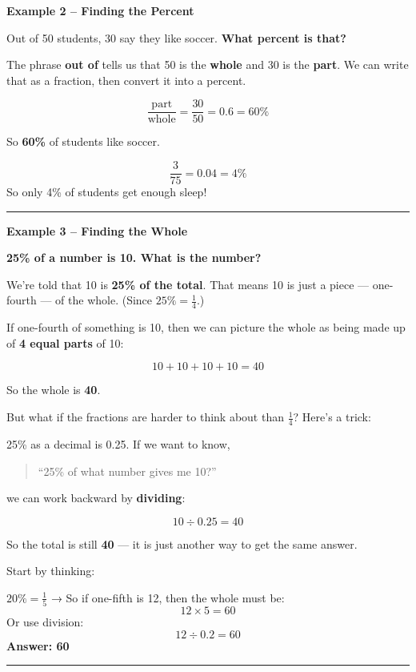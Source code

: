 \documentclass[
  letterpaper,
  DIV=11,
  numbers=noendperiod]{scrreprt}
\begin{document}
\textbf{Example 2 -- Finding the Percent}

Out of 50 students, 30 say they like soccer. \textbf{What percent is
that?}

The phrase \textbf{out of} tells us that 50 is the \textbf{whole} and 30
is the \textbf{part}. We can write that as a fraction, then convert it
into a percent.

\[
\frac{\text{part}}{\text{whole}} = \frac{30}{50} = 0.6 = 60\%
\]

So \textbf{60\%} of students like soccer.

\[
\frac{3}{75} = 0.04 = 4\%
\] So only 4\% of students get enough sleep!

\begin{center}\rule{0.5\linewidth}{0.5pt}\end{center}

\textbf{Example 3 -- Finding the Whole}

\textbf{25\% of a number is 10. What is the number?}

We're told that 10 is \textbf{25\% of the total}. That means 10 is just
a piece --- one-fourth --- of the whole. (Since \(25\% = \frac{1}{4}\).)

If one-fourth of something is 10, then we can picture the whole as being
made up of \textbf{4 equal parts} of 10:

\[
10 + 10 + 10 + 10 = 40
\]

So the whole is \textbf{40}.

But what if the fractions are harder to think about than
\(\frac{1}{4}\)? Here's a trick:

25\% as a decimal is 0.25. If we want to know,

\begin{quote}
``25\% of what number gives me 10?''
\end{quote}

we can work backward by \textbf{dividing}:

\[
10 \div 0.25 = 40
\]

So the total is still \textbf{40} --- it is just another way to get the
same answer.

Start by thinking:

\(20\% = \frac{1}{5}\) → So if one-fifth is 12, then the whole must be:
\[
12 \times 5 = 60
\] Or use division:\\
\[
12 \div 0.2 = 60
\] \textbf{Answer: 60}

\begin{center}\rule{0.5\linewidth}{0.5pt}\end{center}
\end{document}
